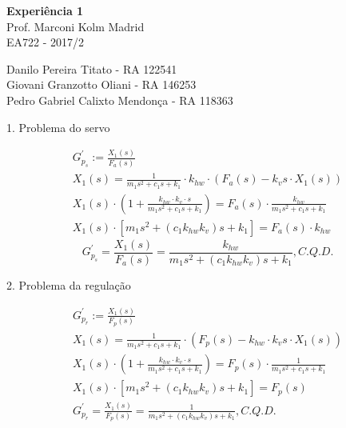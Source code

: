 \documentclass[a4paper,11pt]{article}
\begin{document}
\begin{center}
\textbf{Experiência 1} \\
\hspace{5pt}
Prof. Marconi Kolm Madrid \\
EA722 - 2017/2
\end{center}

\begin{center}
Danilo Pereira Titato - RA 122541 \\
Giovani Granzotto Oliani - RA 146253 \\
Pedro Gabriel Calixto Mendonça - RA 118363 \\
\end{center}

1. Problema do servo

\begin{gather*}
    G^\prime_{p_s} := \frac{X_1 \left( s \right)}{F_a \left( s \right)} \\
    X_{1} \left( s \right) = \frac{1}{m_1s^2 + c_1s + k_1} \cdot k_{hw} \cdot
        \left( F_a \left( s \right) - k_vs \cdot X_1 \left( s \right) \right) \\
    X_{1} \left( s \right) \cdot \left( 1 + \frac{k_{hw} \cdot k_v \cdot s}
        {m_1s^2 + c_1s + k_1} \right) = F_a\left( s \right) \cdot
        \frac{k_{hw}}{m_1s^2 + c_1s + k_1} \\
    X_{1} \left( s \right) \cdot \left[ m_1s^2 + \left( c_1 k_{hw} k_v \right) s
        + k_1 \right] = F_a\left( s \right) \cdot k_{hw}
\end{gather*}
\begin{equation}
    \label{eq:Gps}
    G^\prime_{p_s} = \frac{X_{1}\left( s \right)}{F_a\left( s \right)} =
        \frac{k_{hw}}{m_1s^2 + \left( c_1 k_{hw} k_v \right) s + k_1},
        C.Q.D.
\end{equation}

2. Problema da regulação

\begin{gather*}
    G^\prime_{p_r} := \frac{X_1 \left( s \right)}{F_p \left( s \right)} \\
    X_{1} \left( s \right) = \frac{1}{m_1s^2 + c_1s + k_1} \cdot \left(
        F_p\left( s \right) - k_{hw} \cdot k_vs \cdot X_1 \left( s \right)
        \right) \\
    X_{1} \left( s \right) \cdot \left( 1 + \frac{k_{hw} \cdot k_v \cdot s}
        {m_1s^2 + c_1s + k_1} \right) = F_p \left( s \right) \cdot
        \frac{1}{m_1s^2 + c_1s + k_1} \\
    X_{1} \left( s \right) \cdot \left[ m_1s^2 + \left( c_1 k_{hw} k_v \right) s
        + k_1 \right] = F_p\left( s \right) \\
    G^\prime_{p_r} = \frac{X_{1}\left( s \right)}{F_p\left( s \right)} =
        \frac{1}{m_1s^2 + \left( c_1 k_{hw} k_v \right) s + k_1}, C.Q.D.
\end{gather*}
\end{document}
